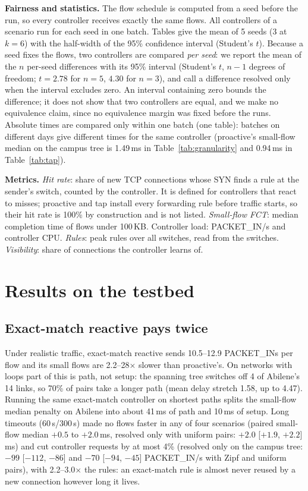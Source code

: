 \documentclass[sigconf]{acmart}
\begin{document}
\textbf{Fairness and statistics.} The flow schedule is computed from a seed before the run, so every controller receives exactly the same flows. All controllers of a scenario run for each seed in one batch. Tables give the mean of 5 seeds (3 at $k{=}6$) with the half-width of the 95\% confidence interval (Student's $t$). Because a seed fixes the flows, two controllers are compared \emph{per seed}: we report the mean of the $n$ per-seed differences with its 95\% interval (Student's $t$, $n{-}1$ degrees of freedom; $t{=}2.78$ for $n{=}5$, $4.30$ for $n{=}3$), and call a difference resolved only when the interval excludes zero. An interval containing zero bounds the difference; it does not show that two controllers are equal, and we make no equivalence claim, since no equivalence margin was fixed before the runs. Absolute times are compared only within one batch (one table): batches on different days give different times for the same controller (proactive's small-flow median on the campus tree is 1.49\,ms in Table~\ref{tab:granularity} and 0.94\,ms in Table~\ref{tab:tap}).

\textbf{Metrics.} \emph{Hit rate}: share of new TCP connections whose SYN finds a rule at the sender's switch, counted by the controller. It is defined for controllers that react to misses; proactive and tap install every forwarding rule before traffic starts, so their hit rate is 100\% by construction and is not listed. \emph{Small-flow FCT}: median completion time of flows under 100\,KB. Controller load: PACKET\_IN/s and controller CPU. \emph{Rules}: peak rules over all switches, read from the switches. \emph{Visibility}: share of connections the controller learns of.

\section{Results on the testbed}\label{sec:granularity}

\subsection{Exact-match reactive pays twice}
Under realistic traffic, exact-match reactive sends 10.5--12.9 PACKET\_INs per flow and its small flows are 2.2--28$\times$ slower than proactive's. On networks with loops part of this is path, not setup: the spanning tree switches off 4 of Abilene's 14 links, so 70\% of pairs take a longer path (mean delay stretch 1.58, up to 4.47). Running the same exact-match controller on shortest paths splits the small-flow median penalty on Abilene into about 41\,ms of path and 10\,ms of setup. Long timeouts (60\,s/300\,s) made no flows faster in any of four scenarios (paired small-flow median $+0.5$ to $+2.0$\,ms, resolved only with uniform pairs: $+2.0$ [$+1.9$, $+2.2$]\,ms) and cut controller requests by at most 4\% (resolved only on the campus tree: $-99$ [$-112$, $-86$] and $-70$ [$-94$, $-45$] PACKET\_IN/s with Zipf and uniform pairs), with 2.2--3.0$\times$ the rules: an exact-match rule is almost never reused by a new connection however long it lives.
\end{document}
